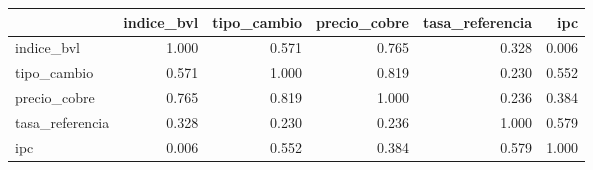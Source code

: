 \begin{tabular}{lrrrrr}
\toprule
 & indice_bvl & tipo_cambio & precio_cobre & tasa_referencia & ipc \\
\midrule
indice_bvl & 1.000 & 0.571 & 0.765 & 0.328 & 0.006 \\
tipo_cambio & 0.571 & 1.000 & 0.819 & 0.230 & 0.552 \\
precio_cobre & 0.765 & 0.819 & 1.000 & 0.236 & 0.384 \\
tasa_referencia & 0.328 & 0.230 & 0.236 & 1.000 & 0.579 \\
ipc & 0.006 & 0.552 & 0.384 & 0.579 & 1.000 \\
\bottomrule
\end{tabular}
